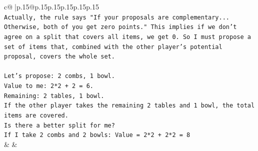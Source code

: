 \documentclass{article}
\begin{document}
{\begin{supertabular}{c@{$\;$}|p{.15\linewidth}@{}p{.15\linewidth}p{.15\linewidth}p{.15\linewidth}p{.15\linewidth}p{.15\linewidth}}
{{{\\ 
\texttt{Actually, the rule says "If your proposals are complementary... Otherwise, both of you get zero points." This implies if we don't agree on a split that covers all items, we get 0. So I must propose a set of items that, combined with the other player's potential proposal, covers the whole set.} \\
\\ 
\texttt{Let's propose: 2 combs, 1 bowl.} \\
\texttt{Value to me: 2*2 + 2 = 6.} \\
\texttt{Remaining: 2 tables, 1 bowl.} \\
\texttt{If the other player takes the remaining 2 tables and 1 bowl, the total items are covered.} \\
\texttt{Is there a better split for me?} \\
\texttt{If I take 2 combs and 2 bowls: Value = 2*2 + 2*2 = 8} \\
            }
        }
    }
    & & \\ \\


\end{supertabular}}
\end{document}
